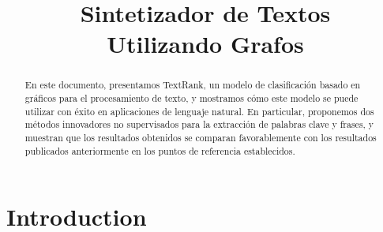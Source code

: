 \documentclass[conference]{IEEEtran}
\begin{document}
\title{Sintetizador de Textos\\ Utilizando Grafos}

\author{

\IEEEauthorblockN{}

}
\maketitle

\begin{abstract}
En este documento, presentamos TextRank, un modelo de clasificación basado en gráficos para el procesamiento de texto, y mostramos cómo este modelo se puede utilizar con éxito en aplicaciones de lenguaje natural. En particular, proponemos dos métodos innovadores no supervisados para la extracción de palabras clave y frases, y muestran que los resultados obtenidos se comparan favorablemente con los resultados publicados anteriormente en los puntos de referencia establecidos.
\end{abstract}

\IEEEpeerreviewmaketitle

\section{Introduction}
\end{document}
